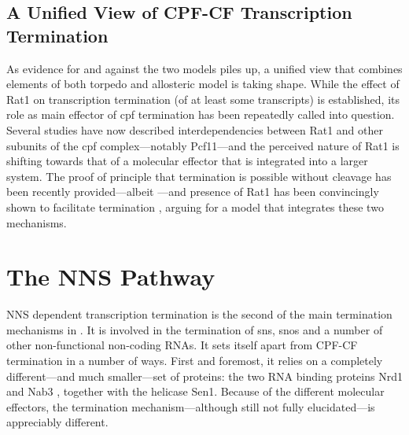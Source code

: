 \subsection{A Unified View of CPF-CF Transcription Termination}

As evidence for and against the two models piles up, a unified view that combines elements of both torpedo and allosteric model is taking shape.
While the effect of Rat1 on transcription termination (of at least some transcripts) is established, its role as main effector of \gls{cpf} termination has been repeatedly called into question.
Several studies have now described interdependencies between Rat1 and other subunits of the \gls{cpf} complex---notably Pcf11---and the perceived nature of Rat1 is shifting towards that of a molecular effector  that is integrated into a larger system.
The proof of principle that termination is possible without cleavage has been recently provided---albeit \invitro{} \cite{zhang:2015:polya}---and presence of Rat1 has been convincingly shown to facilitate termination \cite{fong:2015:effects}, arguing for a model that integrates these two mechanisms.


\clearpage

\section{The NNS Pathway}

NNS dependent transcription termination is the second of the main termination mechanisms in \cer{}. 
It is involved in the termination of \gls{sns}, \gls{snos} and a number of other non-functional non-coding RNAs.
It sets itself apart from CPF-CF termination in a number of ways.
First and foremost, it relies on a completely different---and much smaller---set of proteins: the two RNA binding proteins Nrd1 and Nab3 \cite{conrad:2000:yeast}, together with the helicase Sen1. 
Because of the different molecular effectors, the termination mechanism---although still not fully elucidated---is appreciably different. 

